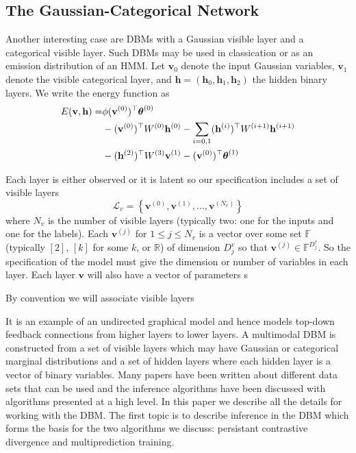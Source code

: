 \documentclass{article} %
\begin{document}
\subsection{The Gaussian-Categorical Network}

Another interesting case are DBMs with a Gaussian visible layer and a categorical visible layer.  Such DBMs may be used in classication or as an emission distribution of an HMM. Let $\mathbf{v}_0$ denote the input Gaussian variables, $\mathbf{v}_1$ denote the visible categorical
layer, and $\mathbf{h}=(\mathbf{h}_0,\mathbf{h}_1,\mathbf{h}_2)$ the hidden binary layers.  We write the energy function as
\begin{align}
E(\mathbf{v},\mathbf{h}) =& \phi(\mathbf{v}^{(0)})^\top\boldsymbol{\theta}^{(0)} \notag\\
& - (\mathbf{v}^{(0)})^\top W^{(0)} \mathbf{h}^{(0)} - \sum_{i=0,1} (\mathbf{h}^{(i)})^\top W^{(i+1)} \mathbf{h}^{(i+1)}\notag\\
& - (\mathbf{h}^{(2)})^\top W^{(3)} \mathbf{v}^{(1)} - (\mathbf{v}^{(0)})^\top \boldsymbol{\theta}^{(1)}
\end{align}



Each layer is either observed or it is latent
so our specification includes a set of visible layers
\begin{equation}
\mathcal{L}_v=\left\{\mathbf{v}^{(0)},\mathbf{v}^{(1)},\ldots,\mathbf{v}^{\left(N_v\right)}\right\}
\end{equation}
where $N_v$ is the number of visible layers (typically two: one for the inputs and one for the labels).  Each $\mathbf{v}^{(j)}$ for
$1\leq j\leq N_v$ is a vector over some set $\mathbb{F}$ (typically $[2]$, $[k]$ for some $k$, or $\mathbb{R}$) of dimension
$D^{v}_j$ so that $\mathbf{v}^{(j)}\in \mathbb{F}^{D^v_j}$. So the specification of the model must give the dimension or number of variables
in each layer.  Each layer $\mathbf{v}$ will also have a vector of parameters s  

  By convention we will associate visible layers



 It is an example of an undirected graphical model and hence models top-down feedback connections
from higher layers to lower layers.  A multimodal DBM is constructed from a set of visible layers which may have Gaussian or categorical
marginal distributions and a set of hidden layers where each hidden layer is a vector of binary variables.  Many papers have been written
about different data sets that can be used and the inference algorithms have been discussed with algorithms presented at a high level.
In this paper we describe all the details for working with the DBM.  The first topic is to describe inference in the DBM which forms
the basis for the two algorithms we discuss: persistant contrastive divergence and multiprediction training.
\end{document}
